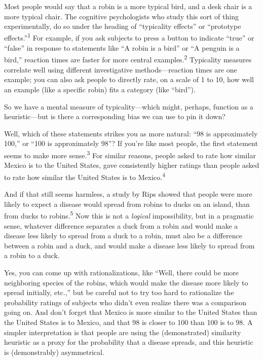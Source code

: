 {
 Most people would say that a robin is a more typical bird, and a
desk chair is a more typical chair. The cognitive psychologists who
study this sort of thing experimentally, do so under the heading of
``typicality effects'' or
``prototype
effects.''\textsuperscript{1} For example, if you ask
subjects to press a button to indicate
``true'' or
``false'' in response to statements
like ``A robin is a bird'' or
``A penguin is a bird,'' reaction
times are faster for more central examples.\textsuperscript{2}
Typicality measures correlate well using different investigative
methods---reaction times are one example; you can also ask people to
directly rate, on a scale of 1 to 10, how well an example (like a
specific robin) fits a category (like
``bird'').}

{
 So we have a mental measure of typicality---which might, perhaps,
function as a heuristic---but is there a corresponding bias we can use
to pin it down?}

{
 Well, which of these statements strikes you as more natural:
``98 is approximately 100,'' or
``100 is approximately 98''? If
you're like most people, the first statement seems to
make more sense.\textsuperscript{3} For similar reasons, people asked
to rate how similar Mexico is to the United States, gave consistently
higher ratings than people asked to rate how similar the United States
is to Mexico.\textsuperscript{4}}

{
 And if that still seems harmless, a study by Rips showed that
people were more likely to expect a disease would spread from robins to
ducks on an island, than from ducks to robins.\textsuperscript{5} Now
this is not a \textit{logical} impossibility, but in a pragmatic sense,
whatever difference separates a duck from a robin and would make a
disease less likely to spread from a duck to a robin, must also be a
difference between a robin and a duck, and would make a disease less
likely to spread from a robin to a duck.}

{
 Yes, you can come up with rationalizations, like
``Well, there could be more neighboring species of the
robins, which would make the disease more likely to spread initially,
etc.,'' but be careful not to try too hard to
rationalize the probability ratings of subjects who
didn't even realize there was a comparison going on.
And don't forget that Mexico is more similar to the
United States than the United States is to Mexico, and that 98 is
closer to 100 than 100 is to 98. A simpler interpretation is that
people are using the (demonstrated) similarity heuristic as a proxy for
the probability that a disease spreads, and this heuristic is
(demonstrably) asymmetrical.}

